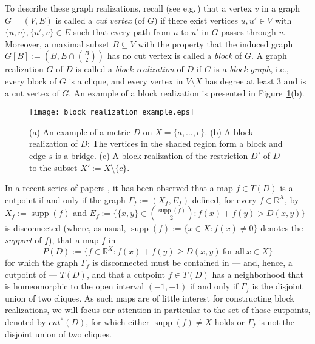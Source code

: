 \documentclass[12pt]{article}
\DeclareMathOperator*{\supp}{supp}
\begin{document}
To describe these graph realizations,
recall (see e.g.\,\cite{wes-96a})
that a vertex \(v\) in a  
graph \(G = (V,E)\) is called a 
\emph{cut vertex} (of $G$) if there exist vertices $u,u'\in V$ with $\{u,v\}, \{u',v\}\in E$  such that every path from $u$ to $u'$ in $G$ passes through $v$. 
Moreover, a maximal subset \(B \subseteq V\) 
with the property that the induced graph \(G[B] := (B, E \cap \binom{B}{2})\)
has no cut vertex is called a \emph{block} of \(G\).
A graph realization \(G\) of \(D\) is called a \emph{block realization} of \(D\) if \(G\) is a {\em block graph}, i.e., every 
block of \(G\) is a clique, and every vertex in \(V \setminus X\) has degree at least 3 and
is a cut vertex of \(G\). 
An example of a block realization is presented in Figure~\ref{figure:block:realization}(b).

\begin{figure}
\centering
\texttt{[image: block\_realization\_example.eps]}
\caption{(a) An example of a metric \(D\) on \(X=\{a,\dots,e\}\).
         (b) A block realization of \(D\): The vertices in the shaded
             region form a block and edge \(s\) is a bridge.
         (c) A block realization of the restriction \(D'\) of \(D\) to
             the subset \(X' := X \setminus \{c\}\).}
\label{figure:block:realization}
\end{figure}

In a recent series of papers 
\cite{dre-hub-koo-08a,dress:huber:compatible:decompositions:2008,dress:huber:koolen:moulton:cut:points:2007},
it has been observed 
that a map \(f \in T(D)\) is a  cutpoint if and only
if the graph
$\Gamma_f:=(X_f,E_f)$ defined, for every \(f \in \mathbb{R}^X\), by 
$
X_f := \supp(f) $ and  $E_f:=\big\{\{x,y\} \in \binom{\supp(f)}{2}:
f(x) + f(y) > D(x,y)\big\}$ is disconnected (where, as usual, 
\(\supp(f) := \{x \in X : f(x) \neq 0\}\) denotes the \emph{support} of \(f\)), that a map \(f\) in 
\[
P(D) := \{f \in \mathbb{R}^X : f(x) + f(y) \geq D(x,y) \ \text{for all} \ x \in X\}
\]
for which the graph \(\Gamma_f\) is disconnected 
must be contained in --- and, hence, a cutpoint of --- $T(D)$,
and that a cutpoint \(f \in T(D)\) has a neighborhood that is homeomorphic to the open interval 
\((-1,+1)\) if and only if  \(\Gamma_f\) is the disjoint union of two cliques. 
As such maps are of little interest for constructing block realizations, 
we will focus our attention in particular to the set of those cutpoints, denoted by \(cut^*(D)\), 
for which either \(\supp(f) \neq X\) holds or
\(\Gamma_f\) is not the disjoint union of two cliques.
\end{document}
